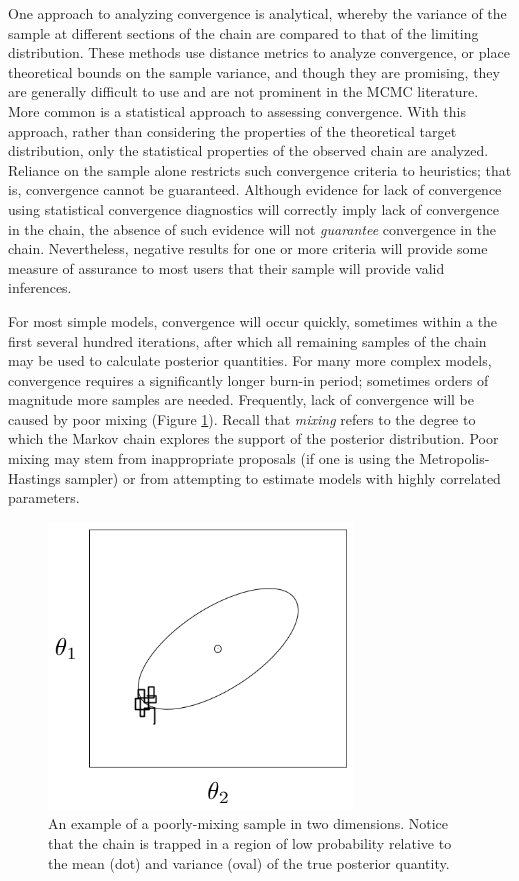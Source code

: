 \documentclass[]{book}
\begin{document}
One approach to analyzing convergence is analytical, whereby the variance of the sample at different sections of the chain are compared to that of the limiting distribution. These methods use distance metrics to analyze convergence, or place theoretical bounds on the sample variance, and though they are promising, they are generally difficult to use and are not prominent in the MCMC literature. More common is a statistical approach to assessing convergence. With this approach, rather than considering the properties of the theoretical target distribution, only the statistical properties of the observed chain are analyzed. Reliance on the sample alone restricts such convergence criteria to heuristics; that is, convergence cannot be guaranteed. Although evidence for lack of convergence using statistical convergence diagnostics will correctly imply lack of convergence in the chain, the absence of such evidence will not \emph{guarantee} convergence in the chain. Nevertheless, negative results for one or more criteria will provide some measure of assurance to most users that their sample will provide valid inferences.

For most simple models, convergence will occur quickly, sometimes within a the first several hundred iterations, after which all remaining samples of the chain may be used to calculate posterior quantities. For many more complex models, convergence requires a significantly longer burn-in period; sometimes  orders of magnitude more samples are needed. Frequently, lack of convergence will be caused by poor mixing (Figure \ref{fig:mix}). Recall that \emph{mixing} refers to the degree to which the Markov chain explores the support of the posterior distribution. Poor mixing may stem from inappropriate proposals (if one is using the Metropolis-Hastings sampler) or from attempting to estimate models with highly correlated parameters.

\begin{figure}[ht]
\begin{center}
\includegraphics[height=3in]{poor_mixing.png}
\caption{An example of a poorly-mixing sample in two dimensions. Notice that the chain is trapped in a region of low probability relative to the mean (dot) and variance (oval) of the true posterior quantity.}
\label{fig:mix}
\end{center}
\end{figure}
\end{document}
